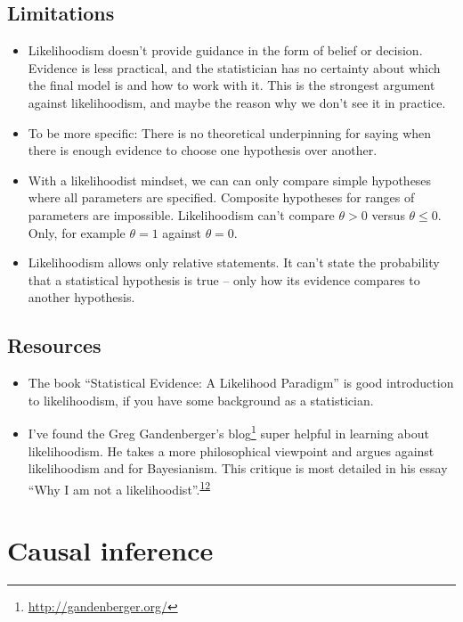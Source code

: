\documentclass[
  10pt,
]{scrbook}
\providecommand{\tightlist}{%
  \setlength{\itemsep}{0pt}\setlength{\parskip}{0pt}}
\renewcommand{\href}[2]{#2\footnote{\url{#1}}}
\begin{document}
\hypertarget{limitations-3}{%
\section{Limitations}\label{limitations-3}}

\begin{itemize}
\tightlist
\item
  Likelihoodism doesn't provide guidance in the form of belief or decision. Evidence is less practical, and the statistician has no certainty about which the final model is and how to work with it. This is the strongest argument against likelihoodism, and maybe the reason why we don't see it in practice.
\item
  To be more specific: There is no theoretical underpinning for saying when there is enough evidence to choose one hypothesis over another.
\item
  With a likelihoodist mindset, we can can only compare simple hypotheses where all parameters are specified. Composite hypotheses for ranges of parameters are impossible. Likelihoodism can't compare \(\theta > 0\) versus \(\theta \leq 0\). Only, for example \(\theta = 1\) against \(\theta = 0\).
\item
  Likelihoodism allows only relative statements. It can't state the probability that a statistical hypothesis is true -- only how its evidence compares to another hypothesis.
\end{itemize}

\hypertarget{resources}{%
\section{Resources}\label{resources}}

\begin{itemize}
\tightlist
\item
  The book ``Statistical Evidence: A Likelihood Paradigm'' is good introduction to likelihoodism, if you have some background as a statistician.
\item
  I've found the \href{http://gandenberger.org/}{Greg Gandenberger's blog} super helpful in learning about likelihoodism. He takes a more philosophical viewpoint and argues against likelihoodism and for Bayesianism. This critique is most detailed in his essay ``Why I am not a likelihoodist''.\textsuperscript{\protect\hyperlink{ref-gandenberger2016not}{12}}
\end{itemize}

\hypertarget{causal-inference}{%
\chapter{Causal inference}\label{causal-inference}}
\end{document}
